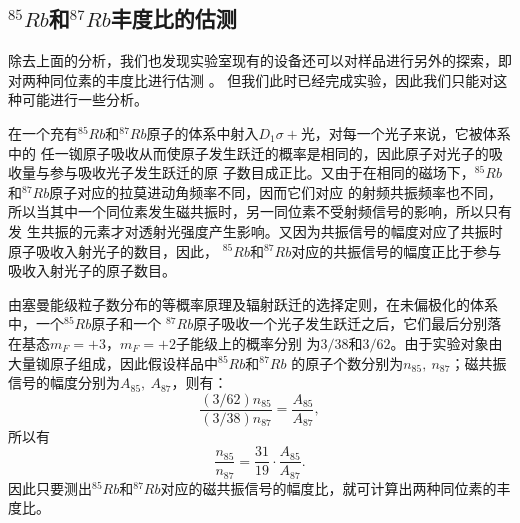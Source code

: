 \documentclass[11pt,a4paper]{article}
\begin{document}
\begin{spacing}{1.3}
\begin{CJK*}{UTF8}{gbsn}
\subsection{$^{85}Rb$和$^{87}Rb$丰度比的估测}
除去上面的分析，我们也发现实验室现有的设备还可以对样品进行另外的探索，即对两种同位素的丰度比进行估测
\cite{ref03}\cite{ref01}。
但我们此时已经完成实验，因此我们只能对这种可能进行一些分析。\par
在一个充有$^{85}Rb$和$^{87}Rb$原子的体系中射入$D_1\sigma +$光，对每一个光子来说，它被体系中的
任一铷原子吸收从而使原子发生跃迁的概率是相同的，因此原子对光子的吸收量与参与吸收光子发生跃迁的原
子数目成正比。又由于在相同的磁场下，$^{85}Rb$和$^{87}Rb$原子对应的拉莫进动角频率不同，因而它们对应
的射频共振频率也不同，所以当其中一个同位素发生磁共振时，另一同位素不受射频信号的影响，所以只有发
生共振的元素才对透射光强度产生影响。又因为共振信号的幅度对应了共振时原子吸收入射光子的数目，因此，
$^{85}Rb$和$^{87}Rb$对应的共振信号的幅度正比于参与吸收入射光子的原子数目。\par 
由塞曼能级粒子数分布的等概率原理及辐射跃迁的选择定则，在未偏极化的体系中，一个$^{85}Rb$原子和一个
$^{87}Rb$原子吸收一个光子发生跃迁之后，它们最后分别落在基态$m_F=+3$，$m_F=+2$子能级上的概率分别
为$3/38$和$3/62$\cite{ref03}。由于实验对象由大量铷原子组成，因此假设样品中$^{85}Rb$和$^{87}Rb$
的原子个数分别为$n_{85},\ n_{87}$；磁共振信号的幅度分别为$A_{85},\ A_{87}$，则有：
\begin{equation}
\frac{(3/62)n_{85}}{(3/38)n_{87}}=\frac{A_{85}}{A_{87}},
\end{equation}
所以有
\begin{equation}
\frac{n_{85}}{n_{87}}=\frac{31}{19}\cdot\frac{A_{85}}{A_{87}}.
\end{equation}
因此只要测出$^{85}Rb$和$^{87}Rb$对应的磁共振信号的幅度比，就可计算出两种同位素的丰度比\cite{ref01}。


\end{CJK*}
\end{spacing}
\end{document}

